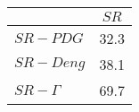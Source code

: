 \begin{tabular}{l|c}
\toprule
{} &  $SR$ \\
\midrule
\textbf{$SR-PDG$   } &  32.3 \\
\textbf{$SR-Deng$  } &  38.1 \\
\textbf{$SR-\Gamma$} &  69.7 \\
\bottomrule
\end{tabular}
